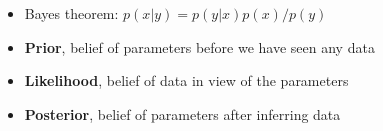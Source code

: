\begin{itemize}
    \item Bayes theorem: $p(x|y) = p(y|x)p(x)/p(y)$
    \item \textbf{Prior}, belief of parameters before we have seen any data
    \item \textbf{Likelihood}, belief of data in view of the parameters
    \item \textbf{Posterior}, belief of parameters after inferring data
\end{itemize}








